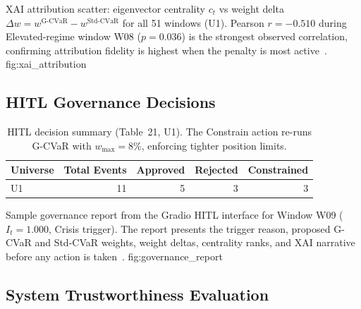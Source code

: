   {XAI attribution scatter: eigenvector centrality $c_t$ vs weight
   delta $\Delta w = w^{\text{G-CVaR}} - w^{\text{Std-CVaR}}$ for
   all 51 windows (U1). Pearson $r = -0.510$ during Elevated-regime
   window W08 ($p = 0.036$) is the strongest observed correlation,
   confirming attribution fidelity is highest when the penalty is
   most active~\citep{bonacich1987,arrieta2020}.}
  {fig:xai_attribution}

\subsection{HITL Governance Decisions}

\begin{table}[htbp]
\centering
\caption{HITL decision summary (Table~21, U1). The Constrain action
         re-runs G-CVaR with $w_{\max} = 8\%$, enforcing tighter
         position limits.}
\label{tab:hitl_summary}
\begin{tabular}{lrrrr}
\toprule
Universe & Total Events & Approved & Rejected & Constrained \\
\midrule
U1 & 11 & 5 & 3 & 3 \\
\bottomrule
\end{tabular}
\end{table}

  {Sample governance report from the Gradio HITL interface for
   Window W09 ($I_t = 1.000$, Crisis trigger). The report presents
   the trigger reason, proposed G-CVaR and Std-CVaR weights,
   weight deltas, centrality ranks, and XAI narrative before any
   action is taken~\citep{holzinger2016,cai2019}.}
  {fig:governance_report}

\subsection{System Trustworthiness Evaluation}

